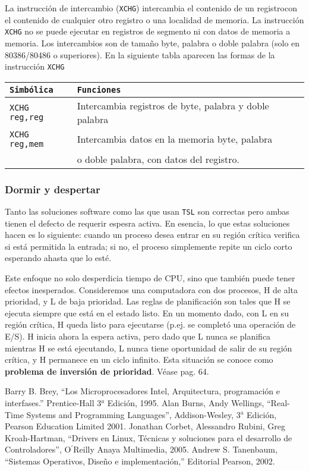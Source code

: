 \documentclass{article}
\begin{document}
\par
\noindent La instrucci\'on de intercambio ({\tt XCHG}) intercambia 
el contenido de un registrocon el contenido de cualquier otro 
registro o una localidad de memoria. La instrucci\'on {\tt XCHG} 
no se puede ejecutar en registros de segmento ni con datos de 
memoria a memoria. Los intercambios son de tama\~no byte, palabra 
o doble palabra (solo en 80386/80486 o superiores). En la siguiente 
tabla aparecen las formas de la instrucci\'on {\tt XCHG}
\begin{center}
\begin{tabular}{|l|l|}\hline
{\tt Simb\'olica}&{\tt Funciones}\\\hline
{\tt XCHG reg,reg}&Intercambia registros de byte, palabra y 
doble palabra\\\hline
{\tt XCHG reg,mem}&Intercambia datos en la memoria byte, palabra \\
&o doble palabra, con datos del registro.\\\hline
\end{tabular}
\end{center}

\subsubsection*{Dormir y despertar}
Tanto las soluciones software como las que usan {\tt TSL} son 
correctas pero ambas tienen el defecto de requerir espesra activa. 
En esencia, lo que estas soluciones hacen es lo siguiente: cuando 
un proceso desea entrar en su regi\'on cr\'itica verifica si est\'a 
permitida la entrada; si no, el proceso simplemente repite un ciclo 
corto esperando ahasta que lo est\'e.

Este enfoque no solo desperdicia tiempo de CPU, sino que tambi\'en 
puede tener efectos inesperados. Consideremos una computadora con 
dos procesos, H de alta prioridad, y L de baja prioridad. Las 
reglas de planificaci\'on son tales que H se ejecuta siempre que 
est\'a en el estado listo. En un momento dado, con L en su regi\'on 
cr\'itica, H queda listo para ejecutarse (p.ej. se complet\'o una 
operaci\'on de E/S). H inicia ahora la espera activa, pero dado que 
L nunca se planifica mientras H se est\'a ejecutando, L nunca tiene 
oportunidad de salir de su regi\'on cr\'itica, y H permanece en un 
ciclo infinito. Esta situaci\'on se conoce como {\bf problema de 
inversi\'on de prioridad}. V\'ease \cite{Tanenbaum} pag. 64.

\eject
\begin{thebibliography}{9}
Barry B. Brey, ``Los Microprocesadores Intel, 
Arquitectura, programaci\'on e interfases.'' Prentice-Hall 
3$^{a}$ Edici\'on, 1995.
Alan Burns, Andy Wellings, ``Real-Time Systems and 
Programming Languages'', Addison-Wesley, 3$^{\mbox{a}}$ Edici\'on, 
Pearson Education Limited 2001.
Jonathan Corbet, Alessandro Rubini, Greg Kroah-Hartman, 
``Drivers en Linux, T\'ecnicas y soluciones para el desarrollo de 
Controladores'', O$^{\prime}$Reilly Anaya Multimedia, 2005.
Andrew S. Tanenbaum, ``Sistemas Operativos, 
Dise\~no e implementaci\'on,'' Editorial Pearson, 2002.
\end{thebibliography}
\end{document}
